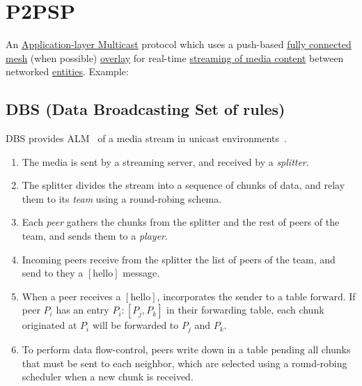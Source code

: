 \section{P2PSP}
An \href{https://en.wikipedia.org/wiki/Multicast}{Application-layer Multicast} protocol which uses a push-based \href{https://en.wikipedia.org/wiki/Network_topology}{fully connected mesh} (when possible) \href{https://en.wikipedia.org/wiki/Overlay_network}{overlay} for real-time \href{(https://en.wikipedia.org/wiki/Streaming_media}{streaming of media content} between networked \href{https://en.wikipedia.org/wiki/Process_%28computing%29}{entities}. Example:

\begin{center}
\end{center}

\subsection{DBS (Data Broadcasting Set of rules)}
DBS provides ALM~\cite{banerjee2002scalable} of a media stream in
unicast environments~\cite{comer2003computer}.
\begin{enumerate}
  \item The media is sent by a streaming server, and received by a
    \emph{splitter}.
  \item The splitter divides the stream into a sequence of chunks of
    data, and relay them to its \emph{team} using a round-robing
    schema.
  \item Each \emph{peer} gathers the chunks from the splitter and the
    rest of peers of the team, and sends them to a \emph{player}.
  \item Incoming peers receive from the splitter the list of peers of
    the team, and send to they a $[\text{hello}]$ message.
  \item When a peer receives a $[\text{hello}]$, incorporates the
    sender to a table $\text{forward}$. If peer $P_i$ has an entry
    $P_i: [P_j, P_k]$ in their forwarding table, each chunk originated
    at $P_i$ will be forwarded to $P_j$ and $P_k$.
  \item To perform data flow-control, peers write down in a table
    $\text{pending}$ all chunks that must be sent to each neighbor,
    which are selected using a round-robing scheduler when a new chunk
    is received.
\end{enumerate}

